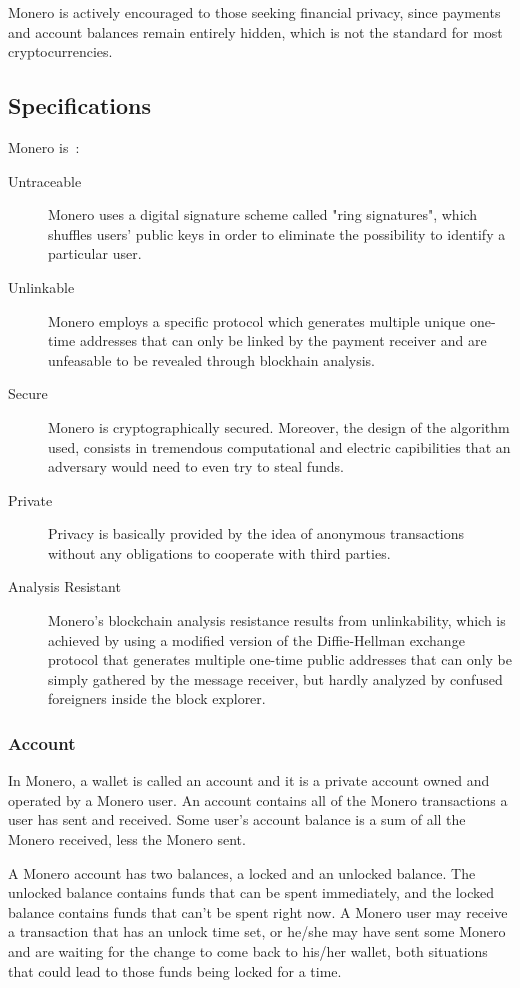 Monero is actively encouraged to those seeking financial privacy, since payments and account balances remain entirely hidden, which is not the standard for most cryptocurrencies.

\subsection{Specifications}
Monero is~\cite{monero}:
\begin{description}
  \item [Untraceable] Monero uses a digital signature scheme called "ring signatures", which shuffles users' public keys in order to eliminate the possibility to identify a particular user.
  \item [Unlinkable] Monero employs a specific protocol which generates multiple unique one-time addresses that can only be linked by the payment receiver and are unfeasable to be revealed through blockhain analysis.
  \item [Secure] Monero is cryptographically secured. Moreover, the design of the algorithm used, consists in tremendous computational and electric capibilities that an adversary would need to even try to steal funds.
  \item [Private] Privacy is basically provided by the idea of anonymous transactions without any obligations to cooperate with third parties.
  \item [Analysis Resistant] Monero's blockchain analysis resistance results from unlinkability, which is achieved by using a modified version of the Diffie-Hellman exchange protocol that generates multiple one-time public addresses that can only be simply gathered by the message receiver, but hardly analyzed by confused foreigners inside the block explorer.
\end{description}

\subsubsection{Account}
In Monero, a wallet is called an account and it is a private account owned and operated by a Monero user. An account contains all of the Monero transactions a user has sent and received. Some user's account balance is a sum of all the Monero received, less the Monero sent.

A Monero account has two balances, a locked and an unlocked balance. The unlocked balance contains funds that can be spent immediately, and the locked balance contains funds that can't be spent right now. A Monero user may receive a transaction that has an unlock time set, or he/she may have sent some Monero and are waiting for the change to come back to his/her wallet, both situations that could lead to those funds being locked for a time.

